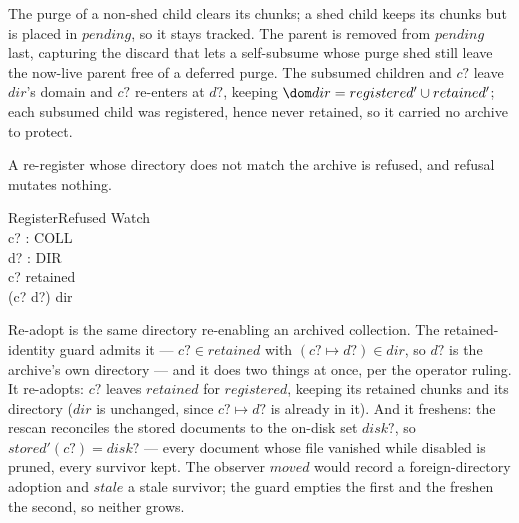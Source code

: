 \documentclass[a4paper]{article}
\begin{document}
The purge of a non-shed child clears its chunks; a shed child keeps its chunks
but is placed in $pending$, so it stays tracked.  The parent is removed from
$pending$ last, capturing the discard that lets a self-subsume whose purge shed
still leave the now-live parent free of a deferred purge.  The subsumed children
and $c?$ leave $dir$'s domain and $c?$ re-enters at $d?$, keeping $\dom dir =
registered' \cup retained'$; each subsumed child was registered, hence never
retained, so it carried no archive to protect.

A re-register whose directory does not match the archive is refused, and refusal
mutates nothing.

\begin{schema}{RegisterRefused}
  \Xi Watch \\
  c? : COLL \\
  d? : DIR \\
  \where
  c? \in retained \\
  (c? \mapsto d?) \notin dir
\end{schema}

Re-adopt is the same directory re-enabling an archived collection.  The
retained-identity guard admits it --- $c? \in retained$ with $(c? \mapsto d?) \in
dir$, so $d?$ is the archive's own directory --- and it does two things at once,
per the operator ruling.  It re-adopts: $c?$ leaves $retained$ for $registered$,
keeping its retained chunks and its directory ($dir$ is unchanged, since $c?
\mapsto d?$ is already in it).  And it freshens: the rescan reconciles the stored
documents to the on-disk set $disk?$, so $stored'(c?) = disk?$ --- every document
whose file vanished while disabled is pruned, every survivor kept.  The
observer $moved$ would record a foreign-directory adoption and $stale$ a stale
survivor; the guard empties the first and the freshen the second, so neither
grows.
\end{document}
